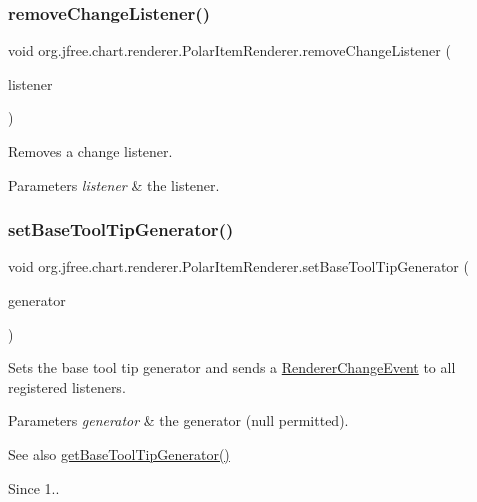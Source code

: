 \subsubsection{\texorpdfstring{remove\+Change\+Listener()}{removeChangeListener()}}
{\footnotesize\ttfamily void org.\+jfree.\+chart.\+renderer.\+Polar\+Item\+Renderer.\+remove\+Change\+Listener (\begin{DoxyParamCaption}\item[{\mbox{\hyperlink{interfaceorg_1_1jfree_1_1chart_1_1event_1_1_renderer_change_listener}{Renderer\+Change\+Listener}}}]{listener }\end{DoxyParamCaption})}

Removes a change listener.


\begin{DoxyParams}{Parameters}
{\em listener} & the listener. \\
\hline
\end{DoxyParams}
\mbox{\label{interfaceorg_1_1jfree_1_1chart_1_1renderer_1_1_polar_item_renderer_a8228783ae5afbc99459106111e892a99}} 
\subsubsection{\texorpdfstring{set\+Base\+Tool\+Tip\+Generator()}{setBaseToolTipGenerator()}}
{\footnotesize\ttfamily void org.\+jfree.\+chart.\+renderer.\+Polar\+Item\+Renderer.\+set\+Base\+Tool\+Tip\+Generator (\begin{DoxyParamCaption}\item[{\mbox{\hyperlink{interfaceorg_1_1jfree_1_1chart_1_1labels_1_1_x_y_tool_tip_generator}{X\+Y\+Tool\+Tip\+Generator}}}]{generator }\end{DoxyParamCaption})}

Sets the base tool tip generator and sends a \mbox{\hyperlink{}{Renderer\+Change\+Event}} to all registered listeners.


\begin{DoxyParams}{Parameters}
{\em generator} & the generator ({\ttfamily null} permitted).\\
\hline
\end{DoxyParams}
\begin{DoxySeeAlso}{See also}
\mbox{\hyperlink{interfaceorg_1_1jfree_1_1chart_1_1renderer_1_1_polar_item_renderer_aeac8f5482fc07b86565f1efce8805e2d}{get\+Base\+Tool\+Tip\+Generator()}}
\end{DoxySeeAlso}
\begin{DoxySince}{Since}
1.. 
\end{DoxySince}


